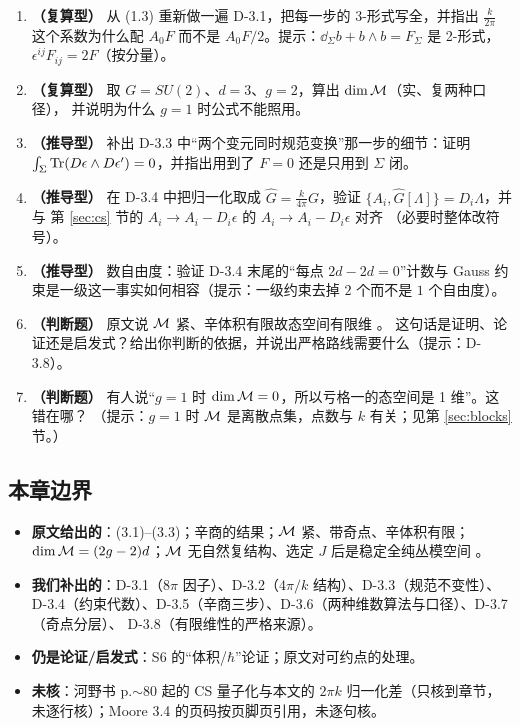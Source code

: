 \begin{enumerate}[leftmargin=2.2em]
\item \textbf{（复算型）} 从 (1.3) 重新做一遍 D-3.1，把每一步的 3-形式写全，并指出
$\frac{k}{2\pi}$ 这个系数为什么配 $A_0F$ 而不是 $A_0F/2$。提示：$\dd_\Sigma b+b\wedge b=F_\Sigma$ 是
2-形式，$\epsilon^{ij}F_{ij}=2F$（按分量）。

\item \textbf{（复算型）} 取 $G=SU(2)$、$d=3$、$g=2$，算出 $\dim\mathcal{M}$（实、复两种口径），
并说明为什么 $g=1$ 时公式不能照用。

\item \textbf{（推导型）} 补出 D-3.3 中“两个变元同时规范变换”那一步的细节：证明
$\int_\Sigma\operatorname{Tr}(D\epsilon\wedge D\epsilon')=0$，并指出用到了 $F=0$ 还是只用到 $\Sigma$ 闭。

\item \textbf{（推导型）} 在 D-3.4 中把归一化取成 $\hat G=\frac{k}{4\pi}G$，验证
$\{A_i,\hat G[\Lambda]\}=D_i\Lambda$，并与 第 \ref{sec:cs} 节的 $A_i\to A_i-D_i\epsilon$ 的 $A_i\to A_i-D_i\epsilon$ 对齐
（必要时整体改符号）。

\item \textbf{（推导型）} 数自由度：验证 D-3.4 末尾的“每点 $2d-2d=0$”计数与
Gauss 约束是一级这一事实如何相容（提示：一级约束去掉 $2$ 个而不是 $1$ 个自由度）。

\item \textbf{（判断题）} 原文说 $\mathcal{M}$ 紧、辛体积有限故态空间有限维 。
这句话是证明、论证还是启发式？给出你判断的依据，并说出严格路线需要什么（提示：D-3.8）。

\item \textbf{（判断题）} 有人说“$g=1$ 时 $\dim\mathcal{M}=0$，所以亏格一的态空间是 1 维”。这错在哪？
（提示：$g=1$ 时 $\mathcal{M}$ 是离散点集，点数与 $k$ 有关；见第 \ref{sec:blocks} 节。）
\end{enumerate}

\subsection{本章边界}

\begin{boundary}
\begin{itemize}[leftmargin=1.4em]
\item \textbf{原文给出的}：(3.1)--(3.3)；辛商的结果；$\mathcal{M}$ 紧、带奇点、辛体积有限；
$\dim\mathcal{M}=(2g-2)d$；$\mathcal{M}$ 无自然复结构、选定 $J$ 后是稳定全纯丛模空间 。
\item \textbf{我们补出的}：D-3.1（$8\pi$ 因子）、D-3.2（$4\pi/k$ 结构）、D-3.3（规范不变性）、
D-3.4（约束代数）、D-3.5（辛商三步）、D-3.6（两种维数算法与口径）、D-3.7（奇点分层）、
D-3.8（有限维性的严格来源）。
\item \textbf{仍是论证/启发式}：S6 的“体积/$\hbar$”论证；原文对可约点的处理。
\item \textbf{未核}：河野书 p.$\sim$80 起的 CS 量子化与本文的 $2\pi k$ 归一化差（只核到章节，
未逐行核）；Moore 3.4 的页码按页脚页引用，未逐句核。
\end{itemize}
\end{boundary}

